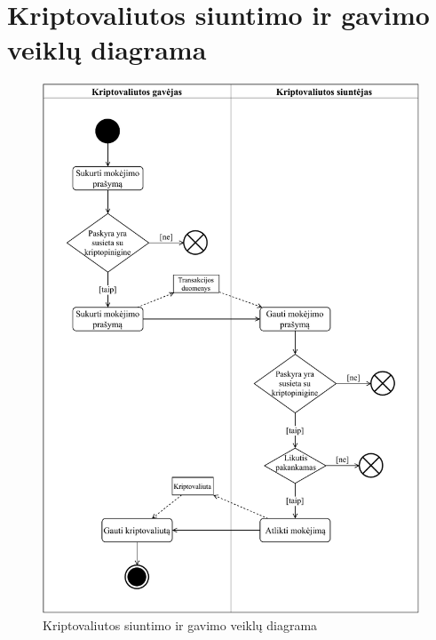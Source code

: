 \section{Kriptovaliutos siuntimo ir gavimo veiklų diagrama} \label{appendix:6}
\begin{figure}[H]
    \centering
    \includegraphics[scale=0.9]{images/ad-3}
    \caption{Kriptovaliutos siuntimo ir gavimo veiklų diagrama}
\end{figure}

